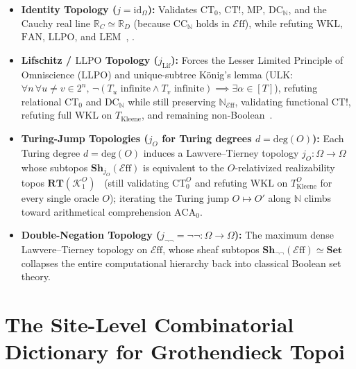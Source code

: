 \documentclass[10pt,twoside,openright]{book}
\theoremstyle{crmplain}
\theoremstyle{crmdef}
\theoremstyle{crmremark}
\newcommand{\Eff}{\mathcal{E}\mathrm{ff}}
\begin{document}
\begin{itemize}[leftmargin=1.5em]

  \item \textbf{Identity Topology ($j = \mathrm{id}_\Omega$):} Validates $\mathrm{CT}_0$, $\mathrm{CT}!$, $\mathrm{MP}$, $\mathrm{DC}_{\mathbb{N}}$, and the Cauchy real line $\mathbb{R}_C \simeq \mathbb{R}_D$ (because $\mathrm{CC}_{\mathbb{N}}$ holds in $\Eff$), while refuting $\mathrm{WKL}$, $\mathrm{FAN}$, $\mathrm{LLPO}$, and $\mathrm{LEM}$~\cite{Hyland82}, \cite[\S 3.2]{vanOosten08}.

  \item \textbf{Lifschitz / $\mathrm{LLPO}$ Topology ($j_{\mathrm{Lif}}$):} Forces the Lesser Limited Principle of Omniscience ($\mathrm{LLPO}$) and unique-subtree K\"onig's lemma ($\mathrm{ULK}$: $\forall n\,\forall u \neq v \in 2^n,\, \neg(T_u\text{ infinite} \wedge T_v\text{ infinite}) \implies \exists \alpha \in [T]$), refuting relational $\mathrm{CT}_0$ and $\mathrm{DC}_{\mathbb{N}}$ while still preserving $\mathbb{N}_{\Eff}$, validating functional $\mathrm{CT}!$, refuting full $\mathrm{WKL}$ on $T_{\mathrm{Kleene}}$, and remaining non-Boolean~\cite[\S 4.4]{vanOosten08}.

  \item \textbf{Turing-Jump Topologies ($j_O$ for Turing degrees $d = \mathrm{deg}(O)$):} Each Turing degree $d = \mathrm{deg}(O)$ induces a Lawvere--Tierney topology $j_O: \Omega \to \Omega$ whose subtopos $\mathbf{Sh}_{j_O}(\Eff)$ is equivalent to the $O$-relativized realizability topos $\mathbf{RT}(\mathcal{K}_1^O)$~\cite{LeeVanOosten13} (still validating $\mathrm{CT}_0^O$ and refuting $\mathrm{WKL}$ on $T_{\mathrm{Kleene}}^O$ for every single oracle $O$); iterating the Turing jump $O \mapsto O'$ along $\mathbb{N}$ climbs toward arithmetical comprehension $\mathrm{ACA}_0$.

  \item \textbf{Double-Negation Topology ($j_{\neg\neg} = \neg\neg: \Omega \to \Omega$):} The maximum dense Lawvere--Tierney topology on $\Eff$, whose sheaf subtopos $\mathbf{Sh}_{\neg\neg}(\Eff) \simeq \mathbf{Set}$ collapses the entire computational hierarchy back into classical Boolean set theory.

\end{itemize}

\section{The Site-Level Combinatorial Dictionary for Grothendieck Topoi}\label{sec:site-combinatorics}
\end{document}
